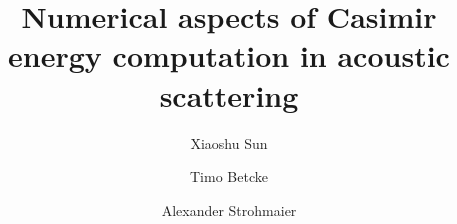 \documentclass[review]{elsarticle}
\begin{document}
\begin{frontmatter}

\title{Numerical aspects of Casimir energy computation in acoustic scattering}

\author[mymainaddress]{Xiaoshu Sun}

\author[mymainaddress]{Timo Betcke}
\address[mymainaddress]{Department of Mathematics, University College London, London, WC1E 6BT, UK}

\author[mysecondaryaddress]{Alexander Strohmaier}
\address[mysecondaryaddress]{School of Mathematics, University of Leeds, Leeds, LS2 9JT, UK}







\end{frontmatter}
\end{document}
